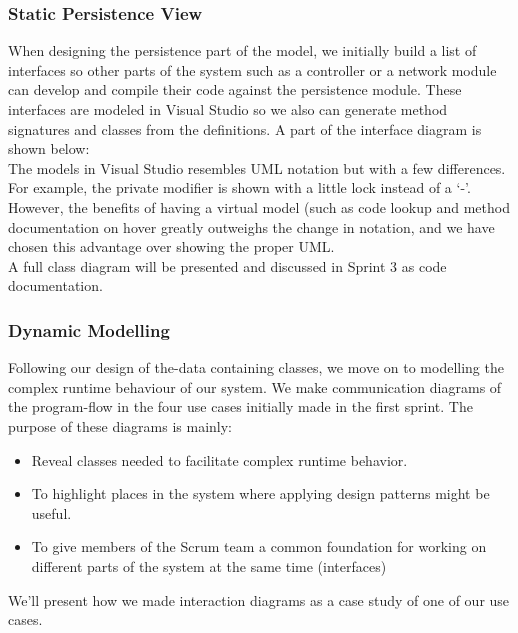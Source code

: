\subsubsection{Static Persistence View}
When designing the persistence part of the model, we initially build a list of interfaces so other parts of the system such as a controller or a network module can develop and compile their code against the persistence module. These interfaces are modeled in Visual Studio so we also can generate method signatures and classes from the definitions. A part of the interface diagram is shown below:\\
The models in Visual Studio resembles UML notation but with a few differences. For example, the private modifier is shown with a little lock instead of a ‘-’. However, the benefits of having a virtual model (such as code lookup and method documentation on hover greatly outweighs the change in notation, and we have chosen this advantage over showing the proper UML.\\
A full class diagram will be presented and discussed in Sprint 3 as code documentation.
\subsubsection{Dynamic Modelling}
Following our design of the-data containing classes, we move on to modelling the complex runtime behaviour of our system. We make communication diagrams of the program-flow in the four use cases initially made in the first sprint. The purpose of these diagrams is mainly:
\begin{itemize}
\item Reveal classes needed to facilitate complex runtime behavior. 
\item To highlight places in the system where applying design patterns might be useful.
\item To give members of the Scrum team a common foundation for working on different parts of the system at the same time (interfaces)
\end{itemize}
We’ll present how we made interaction diagrams as a case study of one of our use cases.
